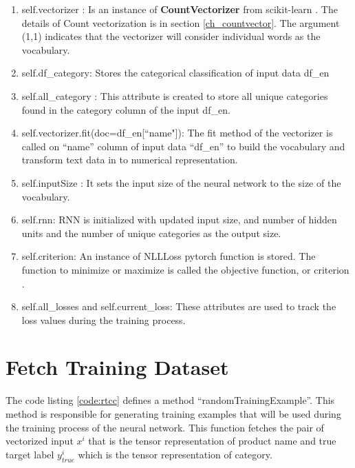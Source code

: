 \begin{enumerate}
    \item self.vectorizer : Is an instance of \textbf{CountVectorizer} from scikit-learn \parencite{sklearn_api}. The details of Count vectorization is in section \ref {ch_countvector}.  The argument (1,1) indicates that the vectorizer will consider individual words as the vocabulary.
    \item self.df\_category: Stores the categorical classification of input data df\_en
    \item self.all\_category : This attribute is created to store all unique categories found in the category column of the input df\_en.
    \item self.vectorizer.fit(doc=df\_en[``name"]): The fit method of the vectorizer is called on ``name'' column of input data ``df\_en'' to build the vocabulary and transform text data in to numerical representation.
    \item self.inputSize : It sets the input size of the neural network to the size of the vocabulary.
    \item self.rnn: \acl{RNN} is initialized with updated input size, and number of hidden units and the number of unique categories as the output size.
    \item self.criterion: An instance of \acf{NLLLoss} pytorch function is stored. The function to minimize or maximize is called the objective function, or criterion \parencite[Section 4.3]{Goodfellow-et-al-2016}.
    \item self.all\_losses and self.current\_loss: These attributes are used to track the loss values during the training process.
\end{enumerate}

\clearpage

\section{Fetch Training Dataset}

The code listing \ref{code:rtcc} defines a method ``randomTrainingExample''. This method is responsible for generating training examples that will be used during the training process of the neural network. This function fetches the pair of vectorized input $x^i$ that is the tensor representation of product name and true target label $y^i_{true}$ which is the tensor representation of category.

